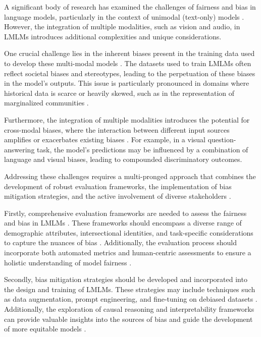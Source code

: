 \documentclass[11pt]{article}
\begin{document}
A significant body of research has examined the challenges of fairness and bias in language models, particularly in the context of unimodal (text-only) models \cite{ref100,ref250}. However, the integration of multiple modalities, such as vision and audio, in LMLMs introduces additional complexities and unique considerations.

One crucial challenge lies in the inherent biases present in the training data used to develop these multi-modal models \cite{ref251}. The datasets used to train LMLMs often reflect societal biases and stereotypes, leading to the perpetuation of these biases in the model's outputs. This issue is particularly pronounced in domains where historical data is scarce or heavily skewed, such as in the representation of marginalized communities \cite{ref252}.

Furthermore, the integration of multiple modalities introduces the potential for cross-modal biases, where the interaction between different input sources amplifies or exacerbates existing biases \cite{ref253}. For example, in a visual question-answering task, the model's predictions may be influenced by a combination of language and visual biases, leading to compounded discriminatory outcomes.

Addressing these challenges requires a multi-pronged approach that combines the development of robust evaluation frameworks, the implementation of bias mitigation strategies, and the active involvement of diverse stakeholders \cite{ref254}.

Firstly, comprehensive evaluation frameworks are needed to assess the fairness and bias in LMLMs \cite{ref255}. These frameworks should encompass a diverse range of demographic attributes, intersectional identities, and task-specific considerations to capture the nuances of bias \cite{ref256}. Additionally, the evaluation process should incorporate both automated metrics and human-centric assessments to ensure a holistic understanding of model fairness \cite{ref257}.

Secondly, bias mitigation strategies should be developed and incorporated into the design and training of LMLMs. These strategies may include techniques such as data augmentation, prompt engineering, and fine-tuning on debiased datasets \cite{ref258,ref259}. Additionally, the exploration of causal reasoning and interpretability frameworks can provide valuable insights into the sources of bias and guide the development of more equitable models \cite{ref260}.
\end{document}

